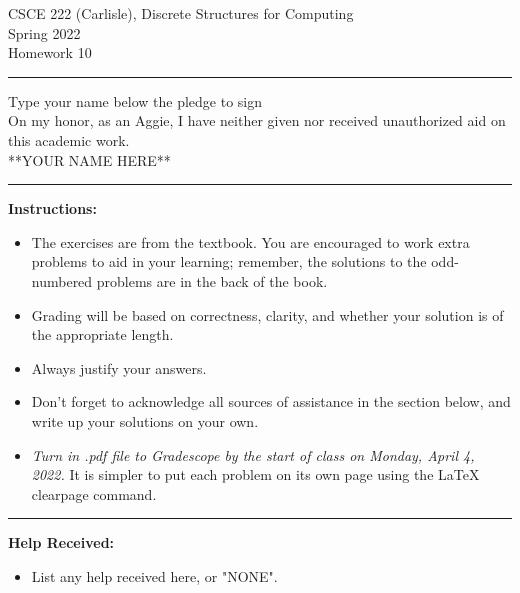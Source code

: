 \documentclass[12pt]{article}  %
\begin{document}
\begin{center}         %
{\large                %
CSCE 222 (Carlisle), Discrete Structures for Computing \\  %
Spring 2022 \\
Homework 10}
\end{center}
\rule{6in}{.1pt}       %
\begin{center}
{\large
Type your name below the pledge to sign\\
On my honor, as an Aggie, I have neither given nor received unauthorized aid on this academic work.\\
**YOUR NAME HERE**}
\end{center}


\rule{6in}{.1pt}       %
                    
\noindent              %
{\bf Instructions:}    %

\begin{itemize}        %
\item The exercises are from the textbook.  You are encouraged to work
      extra problems to aid in your learning; remember, the solutions to 
      the odd-numbered problems are in the back of the book.
\item Grading will be based on correctness, clarity, and whether your
      solution is of the appropriate length.
\item Always justify your answers.
\item Don't forget to acknowledge all sources of assistance in the section below, and write up your solutions on your own.
\item {\em Turn in .pdf file to Gradescope by the start of class on Monday, April 4, 2022.}  It is simpler to put each problem on its own page using the LaTeX clearpage command.
\end{itemize}


\rule{6in}{.1pt}       %

{\bf Help Received:}    %
\begin{itemize}
\item List any help received here, or "NONE".
\end{itemize}
\end{document}
